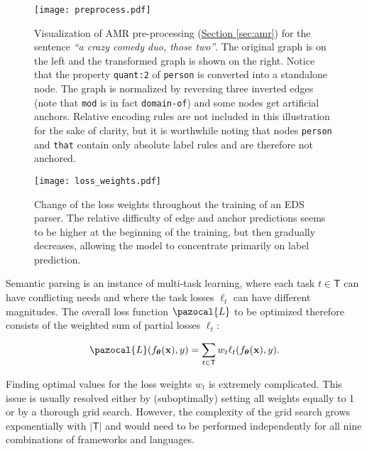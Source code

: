 \documentclass[11pt,a4paper]{article}
\newcommand{\secref}[1]{\hyperref[#1]{Section \ref*{#1}}}
\begin{document}
\begin{figure*}[t]
\centering
\texttt{[image: preprocess.pdf]}
\caption{Visualization of AMR pre-processing (\secref{sec:amr}) for the sentence \emph{``a crazy comedy duo, those two''}. The original graph is on the left and the transformed graph is shown on the right. Notice that the property \texttt{quant:2} of \texttt{person} is converted into a standalone node. The graph is normalized by reversing three inverted edges (note that \texttt{mod} is in fact \texttt{domain-of}) and some nodes get artificial anchors. Relative encoding rules are not included in this illustration for the sake of clarity, but it is worthwhile noting that nodes \texttt{person} and \texttt{that} contain only absolute label rules and are therefore not anchored.}
\label{fig:preprocess}
\end{figure*}

\begin{figure}
\texttt{[image: loss\_weights.pdf]}
\caption{Change of the loss weights throughout the training of an EDS parser. The relative difficulty of edge and anchor predictions seems to be higher at the beginning of the training, but then gradually decreases, allowing the model to concentrate primarily on label prediction.}
\label{fig:loss_weights}
\end{figure}


Semantic parsing is an instance of multi-task learning, where each task $t \in \mathsf{T}$ can have conflicting needs and where the task losses $\ell_t$ can have different magnitudes. The overall loss function $\pazocal{L}$ to be optimized therefore consists of the weighted sum of partial losses $\ell_t$:

$$\pazocal{L}(f_{\bm{\theta}}(\mathbf{x}), y) = \sum_{t \in \mathsf{T}}{w_t \ell_t(f_{\bm{\theta}}(\mathbf{x}), y)}.$$

\noindent
Finding optimal values for the loss weights $w_t$ is extremely complicated. This issue is usually resolved either by (suboptimally) setting all weights equally to 1 or by a thorough grid search. However, the complexity of the grid search grows exponentially with $\left\vert \mathsf{T} \right\vert$ and would need to be performed independently for all nine combinations of frameworks and languages.
\end{document}
